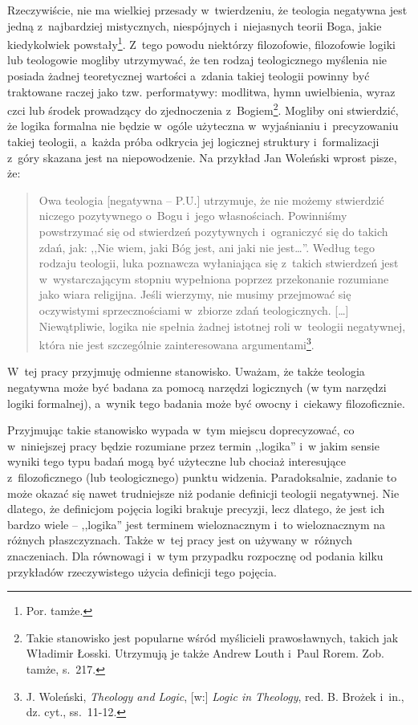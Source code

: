 Rzeczywiście, nie ma wielkiej przesady w~twierdzeniu, że teologia negatywna jest jedną z~najbardziej mistycznych, niespójnych i~niejasnych teorii Boga, jakie kiedykolwiek powstały\footnote{Por. tamże. }. Z~tego powodu niektórzy filozofowie, filozofowie logiki lub teologowie mogliby utrzymywać, że ten rodzaj teologicznego myślenia nie posiada żadnej teoretycznej wartości a~zdania takiej teologii powinny być traktowane raczej jako tzw. performatywy: modlitwa, hymn uwielbienia, wyraz czci lub środek prowadzący do zjednoczenia z~Bogiem\footnote{Takie stanowisko jest popularne wśród myślicieli prawosławnych, takich jak Władimir Łosski. Utrzymują je także Andrew Louth i~Paul Rorem. Zob. tamże, s.~217.}. Mogliby oni stwierdzić, że logika formalna nie będzie w~ogóle użyteczna w~wyjaśnianiu i~precyzowaniu takiej teologii, a~każda próba odkrycia jej logicznej struktury i~formalizacji z~góry skazana jest na niepowodzenie. Na przykład Jan Woleński wprost pisze, że:

\begin{quote}
Owa teologia [negatywna -- P.U.] utrzymuje, że nie możemy stwierdzić niczego pozytywnego o~Bogu i~jego własnościach. Powinniśmy powstrzymać się od stwierdzeń pozytywnych i~ograniczyć się do takich zdań, jak: ,,Nie wiem, jaki Bóg jest, ani jaki nie jest\ldots''. Według tego rodzaju teologii, luka poznawcza wyłaniająca się z~takich stwierdzeń jest w~wystarczającym stopniu wypełniona poprzez przekonanie rozumiane jako wiara religijna. Jeśli wierzymy, nie musimy przejmować się oczywistymi sprzecznościami w~zbiorze zdań teologicznych. [\ldots] Niewątpliwie, logika nie spełnia żadnej istotnej roli w~teologii negatywnej, która nie jest szczególnie zainteresowana argumentami\footnote{J. Woleński, \textit{Theology and Logic}, [w:] \textit{Logic in Theology}, red. B. Brożek i~in., dz. cyt., ss.~11-12.}.
\end{quote}
W~tej pracy przyjmuję odmienne stanowisko. Uważam, że także teologia negatywna może być badana za pomocą narzędzi logicznych (w tym narzędzi logiki formalnej), a~wynik tego badania może być owocny i~ciekawy filozoficznie.

Przyjmując takie stanowisko wypada w~tym miejscu doprecyzować, co w~niniejszej pracy będzie rozumiane przez termin ,,logika'' i~w jakim sensie wyniki tego typu badań mogą być użyteczne lub chociaż interesujące z~filozoficznego (lub teologicznego) punktu widzenia. Paradoksalnie, zadanie to może okazać się nawet trudniejsze niż podanie definicji teologii negatywnej. Nie dlatego, że definicjom pojęcia logiki brakuje precyzji, lecz dlatego, że jest ich bardzo wiele -- ,,logika'' jest terminem wieloznacznym i~to wieloznacznym na różnych płaszczyznach. Także w~tej pracy jest on używany w~różnych znaczeniach. Dla równowagi i~w tym przypadku rozpocznę od podania kilku przykładów rzeczywistego użycia definicji tego pojęcia.


